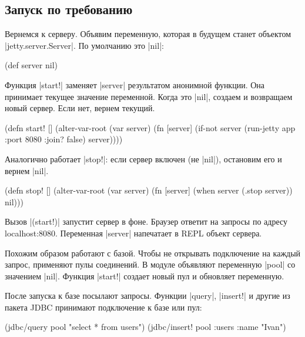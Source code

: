 \subsection{Запуск по требованию}

Вернемся к серверу. Объявим переменную, которая в будущем станет объектом
\spverb|jetty.server.Server|. По умолчанию это \spverb|nil|:

\begin{english}
  \begin{clojure}
(def server nil)
  \end{clojure}
\end{english}

Функция \spverb|start!| заменяет \spverb|server| результатом анонимной
функции. Она принимает текущее значение переменной. Когда это \spverb|nil|,
создаем и возвращаем новый сервер. Если нет, вернем текущий.

\begin{english}
  \begin{clojure}
(defn start! []
  (alter-var-root
   (var server)
   (fn [server]
     (if-not server
       (run-jetty app {:port 8080 :join? false})
       server))))
  \end{clojure}
\end{english}

\noindent
Аналогично работает \spverb|stop!|: если сервер включен (не \spverb|nil|),
остановим его и вернем \spverb|nil|.

\begin{english}
  \begin{clojure}
(defn stop! []
  (alter-var-root
   (var server)
   (fn [server]
     (when server
       (.stop server))
     nil)))
  \end{clojure}
\end{english}

Вызов \spverb|(start!)| запустит сервер в фоне. Браузер ответит на запросы по
адресу localhost:8080. Переменная \spverb|server| напечатает в REPL объект
сервера.

Похожим образом работают с базой. Чтобы не открывать подключение на каждый
запрос, применяют пулы соединений. В модуле объявляют переменную \spverb|pool|
со значением \spverb|nil|. Функция \spverb|start!| создает новый пул и обновляет
переменную.

После запуска к базе посылают запросы. Функции \spverb|query|, \spverb|insert!|
и другие из пакета JDBC принимают подключение к базе или пул:

\begin{english}
  \begin{clojure}
(jdbc/query pool "select * from users")
(jdbc/insert! pool :users {:name "Ivan"})
  \end{clojure}
\end{english}

